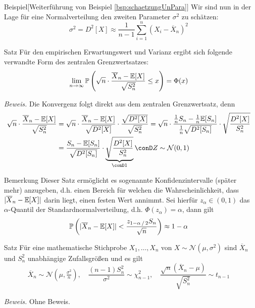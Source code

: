 \begin{colbox}{Beispiel}[Weiterführung von Beispiel \ref{bsp:schaetzungUnPara}]
    Wir sind nun in der Lage für eine Normalverteilung den zweiten Parameter $\sigma^2$ zu schätzen:
    \[
        \sigma^2 = D^2[X] \approx\dfrac{1}{n-1}\sum_{i=1}^{n}(X_i-\overline{X}_n)^2
    \]
\end{colbox}

\begin{colbox}{Satz}
    Für den empirischen Erwartungswert und Varianz ergibt sich folgende verwandte Form des zentralen Grenzwertsatzes:
    \[
        \lim_{n\to\infty} \mathbb P\left(\sqrt{n}\cdot\dfrac{\overline{X}_n-\mathbb E[X]}{\sqrt{S_n^2}}\leq x\right) = \Phi(x)
    \]
\end{colbox}
\textit{Beweis.} Die Konvergenz folgt direkt aus dem zentralen Grenzwertsatz, denn 
\begin{align*}
    \sqrt{n}\cdot\dfrac{\overline{X}_n-\E[X]}{\sqrt{S_n^2}} 
    &= \sqrt{n}\cdot\dfrac{\overline{X}_n-\E[X]}{\sqrt{D^2[X]}} \cdot \dfrac{\sqrt{D^2[X]}}{\sqrt{S_n^2}}
    = \sqrt{n}\cdot\dfrac{\tfrac{1}{n}S_n-\tfrac{1}{n}\E[S_n]}{\tfrac{1}{n}\sqrt{D^2[S_n]}} \cdot \sqrt{\dfrac{D^2[X]}{S_n^2}}\\
    &= \dfrac{S_n-\E[S_n]}{\sqrt{D^2[S_n]}} \cdot \underbrace{\sqrt{\dfrac{D^2[X]}{S_n^2}}}_{\conD 1}
    \conD Z\sim\mathcal{N}(0,1)
\end{align*}

\begin{colbox}{Bemerkung}
    Dieser Satz ermöglicht es sogenannte Konfidenzintervalle (später mehr) anzugeben, d.h. einen Bereich für 
    welchen die Wahrscheinlichkeit, dass $|\overline{X}_n-\mathbb E[X]|$ darin liegt, einen festen Wert annimmt. 
    Sei hierfür $z_\alpha\in(0,1)$ das $\alpha$-Quantil der Standardnormalverteilung, d.h. $\Phi(z_\alpha)=\alpha$, 
    dann gilt 
    \[
        \mathbb P\left(|\overline{X}_n-\mathbb E[X]|<\dfrac{z_{1-\alpha\,/\,2}S_n}{\sqrt{n}}\right) \approx 1-\alpha
    \] 
\end{colbox}

\begin{colbox}{Satz}
    Für eine mathematische Stichprobe $X_1,\dots,X_n$ von $X\sim\mathcal{N}(\mu,\sigma^2)$ sind $\overline{X}_n$ und 
    $S_n^2$ unabhängige Zufallsgrößen und es gilt
    \[
        \overline{X}_n\sim\mathcal{N}(\mu,\tfrac{\sigma^2}{n}), \quad
        \dfrac{(n-1)S_n^2}{\sigma^2}\sim\chi^2_{n-1}, \quad
        \dfrac{\sqrt{n}(\overline{X}_n-\mu)}{\sqrt{S_n^2}}\sim t_{n-1}
    \]
\end{colbox}
\textit{Beweis.} Ohne Beweis.

